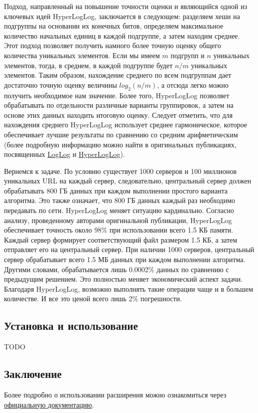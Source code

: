 Подход, направленный на повышение точности оценки и являющийся одной из ключевых идей HyperLogLog, заключается в следующем: разделяем хеши на подгруппы на основании их конечных битов, определяем максимальное количество начальных единиц в каждой подгруппе, а затем находим среднее. Этот подход позволяет получить намного более точную оценку общего количества уникальных элементов. Если мы имеем $m$ подгрупп и $n$ уникальных элементов, тогда, в среднем, в каждой подгруппе будет $n/m$ уникальных элементов. Таким образом, нахождение среднего по всем подгруппам дает достаточно точную оценку величины $log_2{(n/m)}$, а отсюда легко можно получить необходимое нам значение. Более того, HyperLogLog позволяет обрабатывать по отдельности различные варианты группировок, а затем на основе этих данных находить итоговую оценку. Следует отметить, что для нахождения среднего HyperLogLog использует среднее гармоническое, которое обеспечивает лучшие результаты по сравнению со средним арифметическим (более подробную информацию можно найти в оригинальных публикациях, посвященных \href{http://www.ic.unicamp.br/~celio/peer2peer/math/bitmap-algorithms/durand03loglog.pdf}{LogLog} и \href{http://algo.inria.fr/flajolet/Publications/FlFuGaMe07.pdf}{HyperLogLog}).

Вернемся к задаче. По условию существует 1000 серверов и 100 миллионов уникальных URL на каждый сервер, следовательно, центральный сервер должен обрабатывать 800 ГБ данных при каждом выполнении простого варианта алгоритма. Это также означает, что 800 ГБ данных каждый раз необходимо передавать по сети. HyperLogLog меняет ситуацию кардинально. Согласно анализу, проведенному авторами оригинальной публикации, HyperLogLog обеспечивает точность около 98\% при использовании всего 1.5 КБ памяти. Каждый сервер формирует соответствующий файл размером 1.5 КБ, а затем отправляет его на центральный сервер. При наличии 1000 серверов, центральный сервер обрабатывает всего 1.5 МБ данных при каждом выполнении алгоритма. Другими словами, обрабатывается лишь 0.0002\% данных по сравнению с предыдущим решением. Это полностью меняет экономический аспект задачи. Благодаря HyperLogLog, возможно выполнять такие операции чаще и в большем количестве. И все это ценой всего лишь 2\% погрешности.


\subsection{Установка и использование}

TODO

\subsection{Заключение}

Более подробно о использовании расширения можно ознакомиться через \href{https://github.com/aggregateknowledge/postgresql-hll/blob/master/README.markdown}{официальную документацию}.
